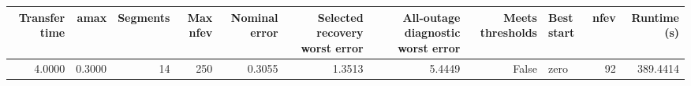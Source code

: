 \begin{tabular}{rrrrrrrrlrr}
\toprule
Transfer time & amax & Segments & Max nfev & Nominal error & Selected recovery worst error & All-outage diagnostic worst error & Meets thresholds & Best start & nfev & Runtime (s) \\
\midrule
4.0000 & 0.3000 & 14 & 250 & 0.3055 & 1.3513 & 5.4449 & False & zero & 92 & 389.4414 \\
\bottomrule
\end{tabular}
